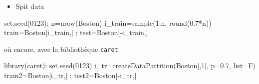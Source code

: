 \documentclass[
  8pt,
  ignorenonframetext,
]{beamer}
\newenvironment{Shaded}{\begin{snugshade}}{\end{snugshade}}
\newcommand{\AttributeTok}[1]{\textcolor[rgb]{0.77,0.63,0.00}{#1}}
\newcommand{\DecValTok}[1]{\textcolor[rgb]{0.00,0.00,0.81}{#1}}
\newcommand{\FloatTok}[1]{\textcolor[rgb]{0.00,0.00,0.81}{#1}}
\newcommand{\FunctionTok}[1]{\textcolor[rgb]{0.00,0.00,0.00}{#1}}
\newcommand{\NormalTok}[1]{#1}
\newcommand{\OtherTok}[1]{\textcolor[rgb]{0.56,0.35,0.01}{#1}}
\newcommand{\SpecialCharTok}[1]{\textcolor[rgb]{0.00,0.00,0.00}{#1}}
\providecommand{\tightlist}{%
  \setlength{\itemsep}{0pt}\setlength{\parskip}{0pt}}
\begin{document}
\begin{frame}[fragile]
\begin{itemize}
\tightlist
\item
  Spit data
\end{itemize}

\footnotesize

\begin{Shaded}
\begin{Highlighting}[]
\FunctionTok{set.seed}\NormalTok{(}\DecValTok{0123}\NormalTok{); n}\OtherTok{=}\FunctionTok{nrow}\NormalTok{(Boston)}
\NormalTok{i\_train}\OtherTok{=}\FunctionTok{sample}\NormalTok{(}\DecValTok{1}\SpecialCharTok{:}\NormalTok{n, }\FunctionTok{round}\NormalTok{(}\FloatTok{0.7}\SpecialCharTok{*}\NormalTok{n))}
\NormalTok{train}\OtherTok{=}\NormalTok{Boston[i\_train,] ; test}\OtherTok{=}\NormalTok{Boston[}\SpecialCharTok{{-}}\NormalTok{i\_train,]}
\end{Highlighting}
\end{Shaded}

\normalsize

où encore, avec la bibliothèque \texttt{caret}

\footnotesize

\begin{Shaded}
\begin{Highlighting}[]
\FunctionTok{library}\NormalTok{(caret); }\FunctionTok{set.seed}\NormalTok{(}\DecValTok{0123}\NormalTok{)}
\NormalTok{i\_tr}\OtherTok{=}\FunctionTok{createDataPartition}\NormalTok{(Boston[,}\DecValTok{1}\NormalTok{], }\AttributeTok{p=}\FloatTok{0.7}\NormalTok{, }\AttributeTok{list=}\NormalTok{F)}
\NormalTok{train2}\OtherTok{=}\NormalTok{Boston[i\_tr,] ; test2}\OtherTok{=}\NormalTok{Boston[}\SpecialCharTok{{-}}\NormalTok{i\_tr,]}
\end{Highlighting}
\end{Shaded}

\normalsize
\end{frame}
\end{document}
